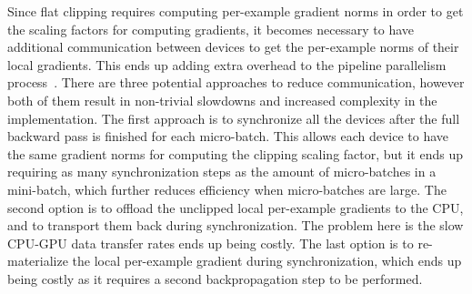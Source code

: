 Since flat clipping requires computing per-example gradient norms in order to get the scaling factors for computing gradients, it becomes necessary to have additional communication between devices to get the per-example norms of their local gradients. This ends up adding extra overhead to the pipeline parallelism process~\cite{RefWorks:RefID:39-he2022exploring}. There are three potential approaches to reduce communication, however both of them result in non-trivial slowdowns and increased complexity in the implementation. The first approach is to synchronize all the devices after the full backward pass is finished for each micro-batch. This allows each device to have the same gradient norms for computing the clipping scaling factor, but it ends up requiring as many synchronization steps as the amount of micro-batches in a mini-batch, which further reduces efficiency when micro-batches are large. 
The second option is to offload the unclipped local per-example gradients to the CPU, and to transport them back during synchronization. The problem here is the slow CPU-GPU data transfer rates ends up being costly. The last option is to re-materialize the local per-example gradient during synchronization, which ends up being costly as it requires a second  backpropagation step to be performed. 



